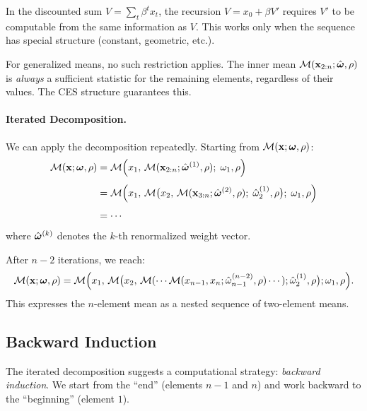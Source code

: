 \begin{calloutnote}
In the discounted sum $V = \sum_t \beta^t x_t$, the recursion $V = x_0 + \beta V'$ requires $V'$ to be computable from the same information as $V$. This works only when the sequence has special structure (constant, geometric, etc.).

For generalized means, no such restriction applies. The inner mean $\mathcal{M}(\mathbf{x}_{2:n}; \hat{\boldsymbol{\omega}}, \rho)$ is \emph{always} a sufficient statistic for the remaining elements, regardless of their values. The CES structure guarantees this.
\end{calloutnote}

\paragraph{Iterated Decomposition.}
We can apply the decomposition repeatedly. Starting from $\mathcal{M}(\mathbf{x}; \boldsymbol{\omega}, \rho)$:
\begin{align}
\mathcal{M}(\mathbf{x}; \boldsymbol{\omega}, \rho) &= \mathcal{M}\Big( x_1, \, \mathcal{M}(\mathbf{x}_{2:n}; \hat{\boldsymbol{\omega}}^{(1)}, \rho); \; \omega_1, \rho \Big) \notag \\[4pt]
&= \mathcal{M}\Big( x_1, \, \mathcal{M}\big( x_2, \, \mathcal{M}(\mathbf{x}_{3:n}; \hat{\boldsymbol{\omega}}^{(2)}, \rho); \; \hat{\omega}_2^{(1)}, \rho \big); \; \omega_1, \rho \Big) \notag \\[4pt]
&= \cdots
\label{eq:iterated-decomposition}
\end{align}
where $\hat{\boldsymbol{\omega}}^{(k)}$ denotes the $k$-th renormalized weight vector.

After $n-2$ iterations, we reach:
\begin{equation}
\mathcal{M}(\mathbf{x}; \boldsymbol{\omega}, \rho) = \mathcal{M}\Big( x_1, \, \mathcal{M}\big( x_2, \, \mathcal{M}( \cdots \mathcal{M}(x_{n-1}, x_n; \hat{\omega}_{n-1}^{(n-2)}, \rho) \cdots ); \hat{\omega}_2^{(1)}, \rho \big); \omega_1, \rho \Big).
\label{eq:full-iteration}
\end{equation}
This expresses the $n$-element mean as a nested sequence of two-element means.

\subsection{Backward Induction}
\label{subsec:backward-induction}

The iterated decomposition suggests a computational strategy: \emph{backward induction}. We start from the ``end'' (elements $n-1$ and $n$) and work backward to the ``beginning'' (element $1$).

